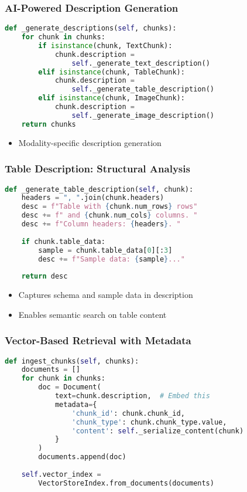 \begin{frame}[fragile]\frametitle{AI-Powered Description Generation}
\begin{lstlisting}[language=Python]
def _generate_descriptions(self, chunks):
    for chunk in chunks:
        if isinstance(chunk, TextChunk):
            chunk.description = 
                self._generate_text_description()
        elif isinstance(chunk, TableChunk):
            chunk.description = 
                self._generate_table_description()
        elif isinstance(chunk, ImageChunk):
            chunk.description = 
                self._generate_image_description()
    return chunks
\end{lstlisting}
\begin{itemize}
\item Modality-specific description generation
\end{itemize}
\end{frame}

\begin{frame}[fragile]\frametitle{Table Description: Structural Analysis}
\begin{lstlisting}[language=Python]
def _generate_table_description(self, chunk):
    headers = ", ".join(chunk.headers)
    desc = f"Table with {chunk.num_rows} rows"
    desc += f" and {chunk.num_cols} columns. "
    desc += f"Column headers: {headers}. "
    
    if chunk.table_data:
        sample = chunk.table_data[0][:3]
        desc += f"Sample data: {sample}..."
    
    return desc
\end{lstlisting}
\begin{itemize}
\item Captures schema and sample data in description
\item Enables semantic search on table content
\end{itemize}
\end{frame}

\begin{frame}[fragile]\frametitle{Vector-Based Retrieval with Metadata}
\begin{lstlisting}[language=Python]
def ingest_chunks(self, chunks):
    documents = []
    for chunk in chunks:
        doc = Document(
            text=chunk.description,  # Embed this
            metadata={
                'chunk_id': chunk.chunk_id,
                'chunk_type': chunk.chunk_type.value,
                'content': self._serialize_content(chunk)
            }
        )
        documents.append(doc)
    
    self.vector_index = 
        VectorStoreIndex.from_documents(documents)
\end{lstlisting}
\end{frame}

